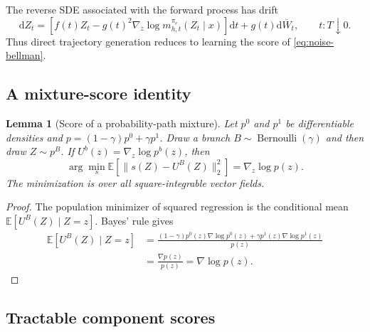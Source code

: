 \documentclass[11pt]{article}
\newtheorem{lemma}[theorem]{Lemma}
\theoremstyle{definition}
\theoremstyle{remark}
\newcommand{\E}{\mathbb E}
\newcommand{\dd}{\mathrm d}
\newcommand{\targetpi}{\pi_e}
\begin{document}
The reverse SDE associated with the forward process has drift
\begin{equation}
\dd Z_t
=
\left[
 f(t)Z_t
 -
 g(t)^2\nabla_z\log m_{h,t}^{\targetpi}(Z_t\mid x)
\right]\dd t
+
g(t)\dd\overline W_t,
\qquad
t:T\downarrow0.
\label{eq:reverse-sde}
\end{equation}
Thus direct trajectory generation reduces to learning the score of
\cref{eq:noise-bellman}.

\subsection{A mixture-score identity}

\begin{lemma}[Score of a probability-path mixture]
\label{lem:mixture-score}
Let $p^0$ and $p^1$ be differentiable densities and
$p=(1-\gamma)p^0+\gamma p^1$. Draw a branch
$B\sim\operatorname{Bernoulli}(\gamma)$ and then draw $Z\sim p^B$. If
$U^b(z)=\nabla_z\log p^b(z)$, then
\begin{equation}
\boxed{
\arg\min_{s}
\E\left[\|s(Z)-U^B(Z)\|_2^2\right]
=
\nabla_z\log p(z).
}
\label{eq:mixture-score-regression}
\end{equation}
The minimization is over all square-integrable vector fields.
\end{lemma}

\begin{proof}
The population minimizer of squared regression is the conditional mean
$\E[U^B(Z)\mid Z=z]$. Bayes' rule gives
\begin{align}
\E[U^B(Z)\mid Z=z]
&=
\frac{
(1-\gamma)p^0(z)\nabla\log p^0(z)
+\gamma p^1(z)\nabla\log p^1(z)
}{p(z)}
\\
&=
\frac{\nabla p(z)}{p(z)}
=
\nabla\log p(z).
\end{align}
\end{proof}

\subsection{Tractable component scores}
\end{document}
